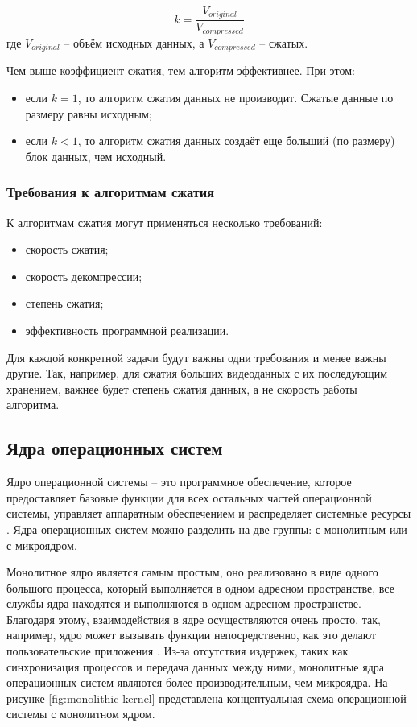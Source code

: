 \begin{equation}\label{fig:memory-compression}
	k = \frac{V_{original}}{V_{compressed}}
\end{equation}
где $V_{original}$ -- объём исходных данных, а $V_{compressed}$ -- сжатых.

Чем выше коэффициент сжатия, тем алгоритм эффективнее. При этом:

\begin{itemize}
	\item если $k = 1$, то алгоритм сжатия данных не производит. Сжатые данные по размеру равны исходным;
	\item если $k < 1$, то алгоритм сжатия данных создаёт еще больший (по размеру) блок данных, чем исходный.
\end{itemize}

\subsubsection{Требования к алгоритмам сжатия}

К алгоритмам сжатия могут применяться несколько требований:

\begin{itemize}
	\item скорость сжатия;
	\item скорость декомпрессии;
	\item степень сжатия;
	\item эффективность программной реализации.
\end{itemize}

Для каждой конкретной задачи будут важны одни требования и менее важны другие. Так, например, для сжатия больших видеоданных с их последующим хранением, важнее будет степень сжатия данных, а не скорость работы алгоритма.

\subsection{Ядра операционных систем}

Ядро операционной системы -- это программное обеспечение, которое предоставляет базовые функции для всех остальных частей операционной системы, управляет аппаратным обеспечением и распределяет системные ресурсы \cite{kernel-development}. Ядра операционных систем можно разделить на две группы: с монолитным или с микроядром. 

Монолитное ядро является самым простым, оно реализовано в виде одного большого процесса, который выполняется в одном адресном пространстве, все службы ядра находятся и выполняются в одном адресном пространстве. Благодаря этому, взаимодействия в ядре осуществляются очень просто, так, например, ядро может вызывать функции непосредственно, как это делают пользовательские приложения \cite{kernel-development}. Из-за отсутствия издержек, таких как синхронизация процессов и передача данных между ними, монолитные ядра операционных систем являются более производительным, чем микроядра. На рисунке \ref{fig:monolithic kernel} представлена концептуальная схема операционной системы с монолитном ядром.

